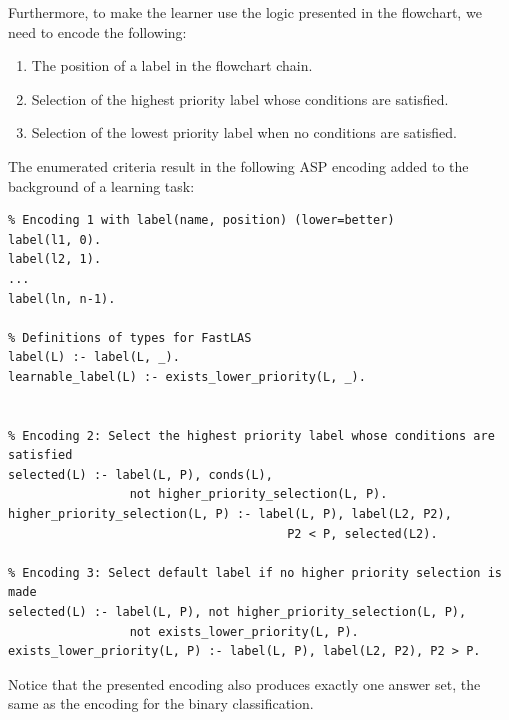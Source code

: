Furthermore, to make the learner use the logic presented in the flowchart, we need to encode the following: 
\begin{enumerate}
    \item The position of a label in the flowchart chain.
    \item Selection of the highest priority label whose conditions are satisfied.
    \item Selection of the lowest priority label when no conditions are satisfied.
\end{enumerate}
The enumerated criteria result in the following ASP encoding added to the background of a learning task:
\begin{lstlisting}
% Encoding 1 with label(name, position) (lower=better)
label(l1, 0).
label(l2, 1).
...
label(ln, n-1).

% Definitions of types for FastLAS
label(L) :- label(L, _).
learnable_label(L) :- exists_lower_priority(L, _).


% Encoding 2: Select the highest priority label whose conditions are satisfied
selected(L) :- label(L, P), conds(L), 
                 not higher_priority_selection(L, P).
higher_priority_selection(L, P) :- label(L, P), label(L2, P2), 
                                       P2 < P, selected(L2).

% Encoding 3: Select default label if no higher priority selection is made
selected(L) :- label(L, P), not higher_priority_selection(L, P), 
                 not exists_lower_priority(L, P).
exists_lower_priority(L, P) :- label(L, P), label(L2, P2), P2 > P.
\end{lstlisting}

Notice that the presented encoding also produces exactly one answer set, the same as the encoding for the binary classification.

